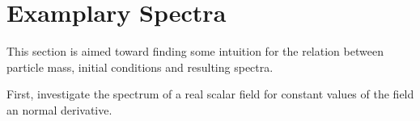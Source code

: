 \section{Examplary Spectra}

This section is aimed toward finding some intuition for the relation between particle mass, initial conditions and resulting spectra.

First, investigate the spectrum of a real scalar field for constant values of the field an normal derivative.\\
